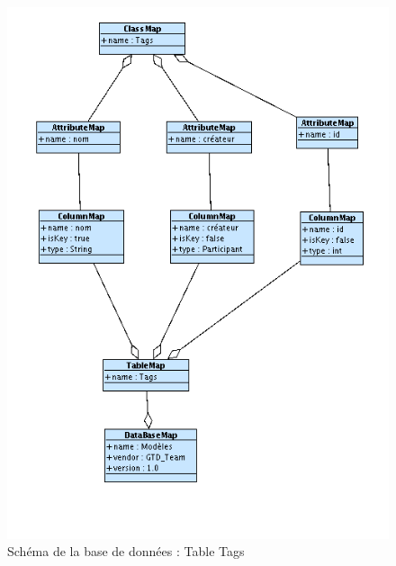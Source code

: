 \begin{figure}[htbp]

		\includegraphics[width=14cm]{images/L4/TagsDBS.png}
	\caption{Schéma de la base de données : Table Tags}
	\label{TagDBS}
\end{figure}


